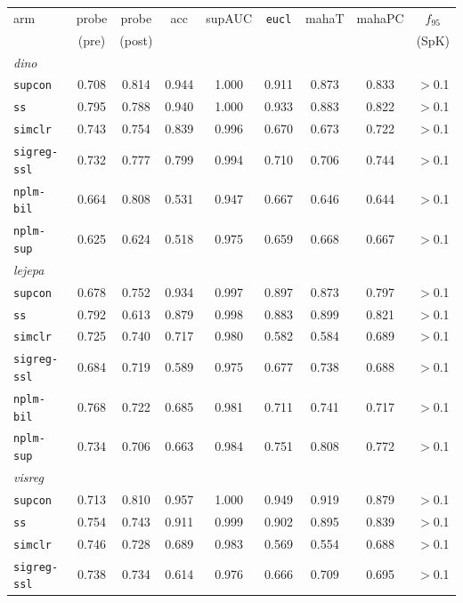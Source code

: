 \documentclass{article}
\begin{document}
\begin{table}[p]\centering\small
\setlength{\tabcolsep}{4pt}
\begin{tabular}{lcccccccc}
\toprule
arm & probe & probe & acc & supAUC & \texttt{eucl} & mahaT & mahaPC & $f_{95}$ \\
    & (pre)  & (post) &     &        &               &       &        & (SpK) \\
\midrule
\multicolumn{9}{l}{\emph{dino}}\\
\texttt{supcon} & 0.708 & 0.814 & 0.944 & 1.000 & 0.911 & 0.873 & 0.833 & $>$0.1 \\
\texttt{ss} & 0.795 & 0.788 & 0.940 & 1.000 & 0.933 & 0.883 & 0.822 & $>$0.1 \\
\texttt{simclr} & 0.743 & 0.754 & 0.839 & 0.996 & 0.670 & 0.673 & 0.722 & $>$0.1 \\
\texttt{sigreg-ssl} & 0.732 & 0.777 & 0.799 & 0.994 & 0.710 & 0.706 & 0.744 & $>$0.1 \\
\texttt{nplm-bil} & 0.664 & 0.808 & 0.531 & 0.947 & 0.667 & 0.646 & 0.644 & $>$0.1 \\
\texttt{nplm-sup} & 0.625 & 0.624 & 0.518 & 0.975 & 0.659 & 0.668 & 0.667 & $>$0.1 \\
\multicolumn{9}{l}{\emph{lejepa}}\\
\texttt{supcon} & 0.678 & 0.752 & 0.934 & 0.997 & 0.897 & 0.873 & 0.797 & $>$0.1 \\
\texttt{ss} & 0.792 & 0.613 & 0.879 & 0.998 & 0.883 & 0.899 & 0.821 & $>$0.1 \\
\texttt{simclr} & 0.725 & 0.740 & 0.717 & 0.980 & 0.582 & 0.584 & 0.689 & $>$0.1 \\
\texttt{sigreg-ssl} & 0.684 & 0.719 & 0.589 & 0.975 & 0.677 & 0.738 & 0.688 & $>$0.1 \\
\texttt{nplm-bil} & 0.768 & 0.722 & 0.685 & 0.981 & 0.711 & 0.741 & 0.717 & $>$0.1 \\
\texttt{nplm-sup} & 0.734 & 0.706 & 0.663 & 0.984 & 0.751 & 0.808 & 0.772 & $>$0.1 \\
\multicolumn{9}{l}{\emph{visreg}}\\
\texttt{supcon} & 0.713 & 0.810 & 0.957 & 1.000 & 0.949 & 0.919 & 0.879 & $>$0.1 \\
\texttt{ss} & 0.754 & 0.743 & 0.911 & 0.999 & 0.902 & 0.895 & 0.839 & $>$0.1 \\
\texttt{simclr} & 0.746 & 0.728 & 0.689 & 0.983 & 0.569 & 0.554 & 0.688 & $>$0.1 \\
\texttt{sigreg-ssl} & 0.738 & 0.734 & 0.614 & 0.976 & 0.666 & 0.709 & 0.695 & $>$0.1 \\

\end{tabular}
\end{table}
\end{document}
